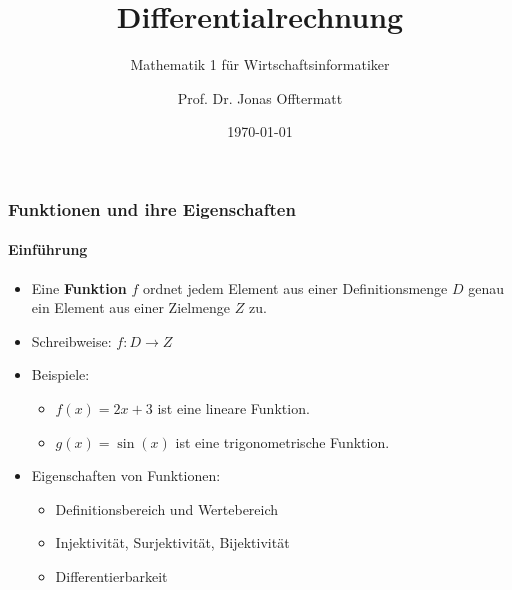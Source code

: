 \documentclass{beamer}
\title{Differentialrechnung}
\subtitle{Mathematik 1 für Wirtschaftsinformatiker}
\author{Prof. Dr. Jonas Offtermatt}
\date{\today}
\begin{document}
\begin{frame}
  \frametitle{Funktionen und ihre Eigenschaften}
  \framesubtitle{Einführung}

  \begin{itemize}
    \item Eine \textbf{Funktion} $f$ ordnet jedem Element aus einer Definitionsmenge $D$ genau ein Element aus einer Zielmenge $Z$ zu.
    \item Schreibweise: $f: D \to Z$
    \item Beispiele:
      \begin{itemize}
        \item $f(x) = 2x + 3$ ist eine lineare Funktion.
        \item $g(x) = \sin(x)$ ist eine trigonometrische Funktion.
      \end{itemize}
    \item Eigenschaften von Funktionen:
      \begin{itemize}
        \item Definitionsbereich und Wertebereich
        \item Injektivität, Surjektivität, Bijektivität
        \item Differentierbarkeit
      \end{itemize}
  \end{itemize}
\end{frame}
\end{document}
